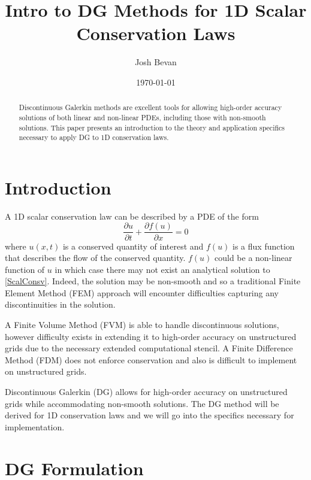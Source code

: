 \documentclass[letterpaper]{article}
\title{Intro to DG Methods for 1D Scalar Conservation Laws}
\author{Josh Bevan}
\date{\today}
\begin{document}
\maketitle
\begin{abstract}
Discontinuous Galerkin methods are excellent tools for allowing high-order accuracy solutions of both linear and non-linear PDEs, including those with non-smooth solutions. This paper presents an introduction to the theory and application specifics necessary to apply DG to 1D conservation laws.
\end{abstract}

\section{Introduction}
A 1D scalar conservation law can be described by a PDE of the form
	\begin{equation}\label{ScalConsv}
	\frac{\partial u}{\partial t} + \frac{\partial f(u)}{\partial x} = 0
	\end{equation}
where $u(x,t)$ is a conserved quantity of interest and $f(u)$ is a flux function that describes the flow of the conserved quantity. $f(u)$ could be a non-linear function of $u$ in which case there may not exist an analytical solution to \eqref{ScalConsv}. Indeed, the solution may be non-smooth and so a traditional Finite Element Method (FEM) approach will encounter difficulties capturing any discontinuities in the solution.

A Finite Volume Method (FVM) is able to handle discontinuous solutions, however difficulty exists in extending it to high-order accuracy on unstructured grids due to the necessary extended computational stencil. A Finite Difference Method (FDM) does not enforce conservation and also is difficult to implement on unstructured grids.

Discontinuous Galerkin (DG) allows for high-order accuracy on unstructured grids while accommodating non-smooth solutions. The DG method will be derived for 1D conservation laws and we will go into the specifics necessary for implementation.

\section{DG Formulation}
\end{document}
